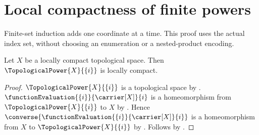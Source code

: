 \section{Local compactness of finite powers}






Finite-set induction adds one coordinate at a time. This proof uses the
actual index set, without choosing an enumeration or a nested-product encoding.

\begin{theorem}\label{singleton_topological_power_is_locally_compact}
    Let $X$ be a locally compact topological space.
    Then $\TopologicalPower{X}{\{i\}}$ is locally compact.
\end{theorem}
\begin{proof}
    $\TopologicalPower{X}{\{i\}}$ is a topological space by
        .
    $\functionEvaluation{\{i\}}{\carrier[X]}{i}$ is a homeomorphism from
        $\TopologicalPower{X}{\{i\}}$ to $X$ by .
    Hence $\converse{\functionEvaluation{\{i\}}{\carrier[X]}{i}}$ is a homeomorphism
        from $X$ to $\TopologicalPower{X}{\{i\}}$ by .
    Follows by .
\end{proof}

